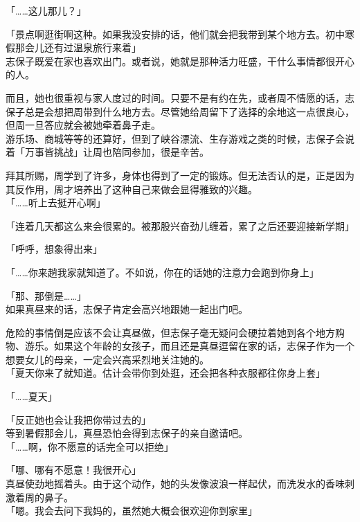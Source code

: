 「……这儿那儿？」

「景点啊逛街啊这种。如果我没安排的话，他们就会把我带到某个地方去。初中寒假那会儿还有过温泉旅行来着」\\

志保子既爱在家也喜欢出门。或者说，她就是那种活力旺盛，干什么事情都很开心的人。

而且，她也很重视与家人度过的时间。只要不是有约在先，或者周不情愿的话，志保子总是会想把周带到什么地方去。尽管她给周留下了选择的余地这一点很良心，但周一旦答应就会被她牵着鼻子走。\\

游乐场、商城等等的还算好，但到了峡谷漂流、生存游戏之类的时候，志保子会说着「万事皆挑战」让周也陪同参加，很是辛苦。

拜其所赐，周学到了许多，身体也得到了一定的锻炼。但无法否认的是，正是因为其反作用，周才培养出了这种自己来做会显得雅致的兴趣。\\

「……听上去挺开心啊」

「连着几天都这么来会很累的。被那股兴奋劲儿缠着，累了之后还要迎接新学期」

「呼呼，想象得出来」

「……你来趟我家就知道了。不如说，你在的话她的注意力会跑到你身上」

「那、那倒是……」\\

如果真昼来的话，志保子肯定会高兴地跟她一起出门吧。

危险的事情倒是应该不会让真昼做，但志保子毫无疑问会硬拉着她到各个地方购物、游乐。如果这个年龄的女孩子，而且还是真昼逗留在家的话，志保子作为一个想要女儿的母亲，一定会兴高采烈地关注她的。\\

「夏天你来了就知道。估计会带你到处逛，还会把各种衣服都往你身上套」

「……夏天」

「反正她也会让我把你带过去的」\\

等到暑假那会儿，真昼恐怕会得到志保子的亲自邀请吧。\\

「……啊，你不愿意的话完全可以拒绝」

「哪、哪有不愿意！我很开心」\\

真昼使劲地摇着头。由于这个动作，她的头发像波浪一样起伏，而洗发水的香味刺激着周的鼻子。\\

「嗯。我会去问下我妈的，虽然她大概会很欢迎你到家里」

